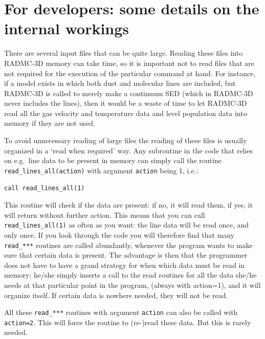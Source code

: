 \documentclass{report}
\begin{document}
\section{For developers: some details on the internal workings}
There are several input files that can be quite large. Reading these files
into RADMC-3D memory can take time, so it is important not to read files
that are not required for the execution of the particular command at 
hand. For instance, if a model exists in which both dust and molecular
lines are included, but RADMC-3D is called to merely make a continuum
SED (which in RADMC-3D never includes the lines), then it would be a
waste of time to let RADMC-3D read all the gas velocity and temperature
data and level population data into memory if they are not used.

To avoid unnecessary reading of large files the reading of these files is
usually organized in a `read when required' way. Any subroutine in the code
that relies on e.g.\ line data to be present in memory can simply call the
routine {\small\tt read\_lines\_all(action)} with argument {\small\tt action} being 1,
i.e.:
\begin{verbatim}
call read_lines_all(1)
\end{verbatim}
This routine will check if the data are present: if no, it will read them,
if yes, it will return without further action. This means that you can call
{\small\tt read\_lines\_all(1)} as often as you want: the line data will be read
once, and only once. If you look through the code you will therefore find
that many {\small\tt read\_***} routines are called abundantly, whenever the
program wants to make sure that certain data is present. The advantage is
then that the programmer does not have to have a grand strategy for when
which data must be read in memory: he/she simply inserts a call to the read
routines for all the data she/he needs at that particular point in the
program, (always with action=1), and it will organize itself. If certain
data is nowhere needed, they will not be read. 

All these {\small\tt read\_***} routines with argument {\small\tt action} can also
be called with {\small\tt action=2}. This will force the routine to (re-)read
these data. But this is rarely needed.



\end{document}
